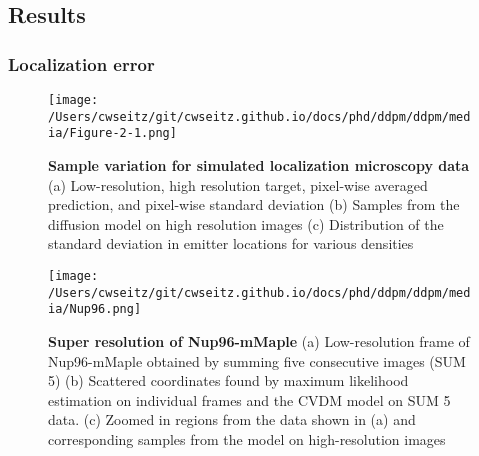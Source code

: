 

\subsection{Results}

\subsubsection{Localization error}

\begin{figure}[t]
\centering
\texttt{[image: /Users/cwseitz/git/cwseitz.github.io/docs/phd/ddpm/ddpm/media/Figure-2-1.png]}
\caption{\textbf{Sample variation for simulated localization microscopy data} (a) Low-resolution, high resolution target, pixel-wise averaged prediction, and pixel-wise standard deviation (b) Samples from the diffusion model on high resolution images (c) Distribution of the standard deviation in emitter locations for various densities}
\label{fig:locobayes}
\end{figure}

\begin{figure}[t]
\centering
\texttt{[image: /Users/cwseitz/git/cwseitz.github.io/docs/phd/ddpm/ddpm/media/Nup96.png]}
\caption{\textbf{Super resolution of Nup96-mMaple} (a) Low-resolution frame of Nup96-mMaple obtained by summing five consecutive images (SUM 5) (b) Scattered coordinates found by maximum likelihood estimation on individual frames and the CVDM model on SUM 5 data. (c) Zoomed in regions from the data shown in (a) and corresponding samples from the model on high-resolution images}
\label{fig:nup96}
\end{figure}



